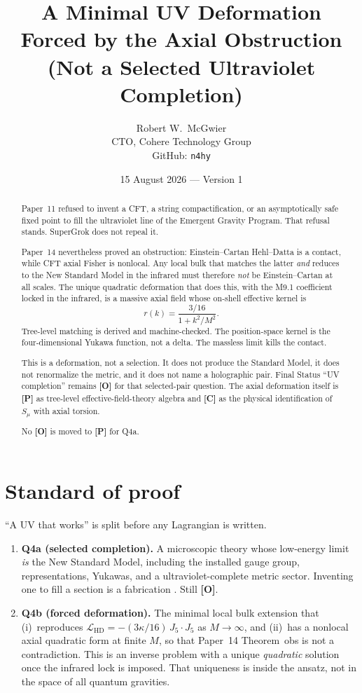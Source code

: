 \documentclass[11pt]{article}
\title{\textbf{A Minimal UV Deformation Forced by the Axial Obstruction\\
(Not a Selected Ultraviolet Completion)}}
\author{Robert W.\ McGwier\\
\small CTO, Cohere Technology Group\\
\small GitHub: \texttt{n4hy}}
\date{15 August 2026 --- Version 1}
\theoremstyle{definition}
\newcommand{\pP}{\textbf{[P]}}
\newcommand{\pC}{\textbf{[C]}}
\newcommand{\pO}{\textbf{[O]}}
\begin{document}
\maketitle

\begin{abstract}
\noindent
Paper~11 refused to invent a CFT, a string compactification, or an
asymptotically safe fixed point to fill the ultraviolet line of the
Emergent Gravity Program. That refusal stands. SuperGrok does not
repeal it.

Paper~14 nevertheless proved an obstruction: Einstein--Cartan
Hehl--Datta is a contact, while CFT axial Fisher is nonlocal. Any
local bulk that matches the latter \emph{and} reduces to the New
Standard Model in the infrared must therefore \emph{not} be
Einstein--Cartan at all scales. The unique quadratic deformation
that does this, with the M9.1 coefficient locked in the infrared,
is a massive axial field whose on-shell effective kernel is
\begin{equation*}
r(k)=\frac{3/16}{1+k^2/M^2}.
\end{equation*}
Tree-level matching is derived and machine-checked. The
position-space kernel is the four-dimensional Yukawa function, not
a delta. The massless limit kills the contact.

This is a deformation, not a selection. It does not produce the
Standard Model, it does not renormalize the metric, and it does
not name a holographic pair. Final Status ``UV completion'' remains
\pO{} for that selected-pair question. The axial deformation itself
is \pP{} as tree-level effective-field-theory algebra and \pC{} as
the physical identification of $S_\mu$ with axial torsion.

No \pO{} is moved to \pP{} for Q4a.
\end{abstract}

\section*{Standard of proof}

``A UV that works'' is split before any Lagrangian is written.

\begin{enumerate}[leftmargin=1.6em]
\item \textbf{Q4a (selected completion).} A microscopic theory whose
low-energy limit \emph{is} the New Standard Model, including the
installed gauge group, representations, Yukawas, and a
ultraviolet-complete metric sector. Inventing one to fill a
section is a fabrication \cite{McGwierXI}. Still \pO{}.
\item \textbf{Q4b (forced deformation).} The minimal local bulk
extension that (i)~reproduces
$\mathcal{L}_{\mathrm{HD}}=-(3\kappa/16)\,J_5\cdot J_5$ as
$M\to\infty$, and (ii)~has a nonlocal axial quadratic form at
finite $M$, so that Paper~14 Theorem~obs is not a contradiction.
This is an inverse problem with a unique \emph{quadratic}
solution once the infrared lock is imposed. That uniqueness is
inside the ansatz, not in the space of all quantum gravities.
\end{enumerate}
\end{document}
